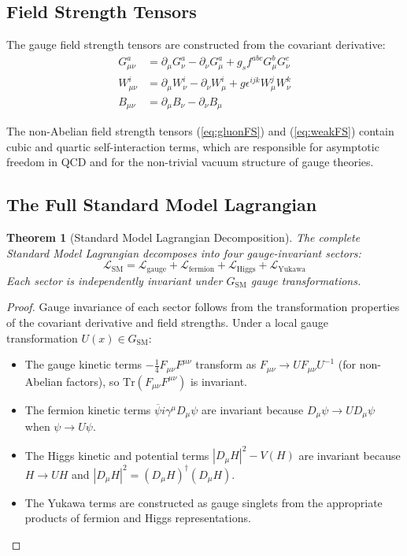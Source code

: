 \documentclass[12pt]{article}
\newtheorem{theorem}{Theorem}[section]
\theoremstyle{definition}
\theoremstyle{remark}
\newcommand{\Lagr}{\mathcal{L}}
\newcommand{\psibar}{\overline{\psi}}
\begin{document}
\subsection{Field Strength Tensors}

The gauge field strength tensors are constructed from the covariant derivative:
\begin{align}
G^a_{\mu\nu} &= \partial_\mu G^a_\nu - \partial_\nu G^a_\mu + g_s f^{abc} G^b_\mu G^c_\nu \label{eq:gluonFS}\\
W^i_{\mu\nu} &= \partial_\mu W^i_\nu - \partial_\nu W^i_\mu + g \epsilon^{ijk} W^j_\mu W^k_\nu \label{eq:weakFS}\\
B_{\mu\nu} &= \partial_\mu B_\nu - \partial_\nu B_\mu \label{eq:hyperchargeFS}
\end{align}

The non-Abelian field strength tensors (\ref{eq:gluonFS}) and (\ref{eq:weakFS}) contain cubic and quartic self-interaction terms, which are responsible for asymptotic freedom in QCD and for the non-trivial vacuum structure of gauge theories.

\subsection{The Full Standard Model Lagrangian}

\begin{theorem}[Standard Model Lagrangian Decomposition]
\label{thm:lagrangian}
The complete Standard Model Lagrangian decomposes into four gauge-invariant sectors:
\begin{equation}
\label{eq:fulllagrangian}
\Lagr_{\mathrm{SM}} = \Lagr_{\mathrm{gauge}} + \Lagr_{\mathrm{fermion}} + \Lagr_{\mathrm{Higgs}} + \Lagr_{\mathrm{Yukawa}}
\end{equation}
Each sector is independently invariant under $G_{\mathrm{SM}}$ gauge transformations.
\end{theorem}

\begin{proof}
Gauge invariance of each sector follows from the transformation properties of the covariant derivative and field strengths. Under a local gauge transformation $U(x) \in G_{\mathrm{SM}}$:
\begin{itemize}
    \item The gauge kinetic terms $-\frac{1}{4}F_{\mu\nu}F^{\mu\nu}$ transform as $F_{\mu\nu} \to U F_{\mu\nu} U^{-1}$ (for non-Abelian factors), so $\mathrm{Tr}(F_{\mu\nu}F^{\mu\nu})$ is invariant.
    \item The fermion kinetic terms $\psibar i \gamma^\mu D_\mu \psi$ are invariant because $D_\mu \psi \to U D_\mu \psi$ when $\psi \to U\psi$.
    \item The Higgs kinetic and potential terms $|D_\mu H|^2 - V(H)$ are invariant because $H \to U H$ and $|D_\mu H|^2 = (D_\mu H)^\dagger (D_\mu H)$.
    \item The Yukawa terms are constructed as gauge singlets from the appropriate products of fermion and Higgs representations.
\end{itemize}
\end{proof}
\end{document}
